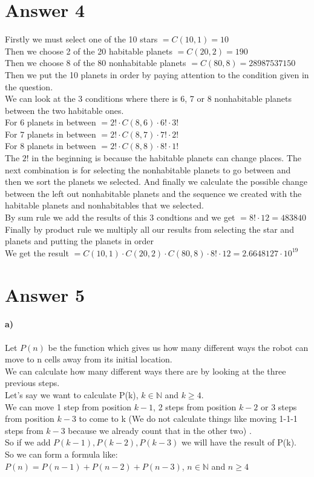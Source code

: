\documentclass[12pt]{article}
\begin{document}
\section*{Answer 4}
Firstly we must select one of the 10 stars $= C(10,1) = 10$\\
Then we choose 2 of the 20 habitable planets $= C(20,2) = 190$\\
Then we choose 8 of the 80 nonhabitable planets $= C(80,8) = 28987537150$\\
Then we put the 10 planets in order by paying attention to the condition given in the question.\\
We can look at the 3 conditions where there is 6, 7 or 8 nonhabitable planets between the two habitable ones.\\
For 6 planets in between $= 2!\cdot C(8,6) \cdot 6! \cdot 3!$\\
For 7 planets in between $= 2!\cdot C(8,7) \cdot 7! \cdot 2!$\\
For 8 planets in between $= 2!\cdot C(8,8) \cdot 8! \cdot 1!$\\
The $2!$ in the beginning is because the habitable planets can change places. The next combination is for selecting the nonhabitable planets to go between and then we sort the planets we selected. And finally we calculate the possible change between the left out nonhabitable planets and the sequence we created with the habitable planets and nonhabitables that we selected.\\
By sum rule we add the results of this 3 condtions and we get $=8!\cdot 12 =  483840$\\
Finally by product rule we multiply all our results from selecting the star and planets and putting the planets in order\\
We get the result $= C(10, 1) \cdot C(20,2) \cdot C(80,8) \cdot 8! \cdot 12 = 2.6648127\cdot 10^{19}$ 


\section*{Answer 5}
\paragraph{a)}
Let $P(n)$ be the function which gives us how many different ways the robot can move to n cells away from its initial location.\\
We can calculate how many different ways there are by looking at the three previous steps.\\
Let's say we want to calculate P(k), $k \in \mathbb{N}$ and $  k\ge 4$.\\
We can move 1 step from position $k-1$, 2 steps from position $k-2$ or 3 steps from position $k-3$ to come to k (We do not calculate things like moving 1-1-1 steps from $k-3$ because we already count that in the other two) .\\
So if we add $P(k-1), P(k-2), P(k-3)$ we will have the result of P(k).\\
So we can form a formula like:\\
$P(n) = P(n-1) + P(n-2) + P(n-3)$, $n \in \mathbb{N}$ and $  n\ge 4$
\end{document}
